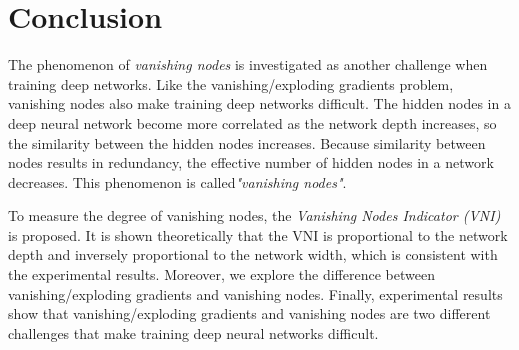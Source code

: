 \chapter{Conclusion} \label{conclusion}

The phenomenon of \textit{vanishing nodes}  is investigated as another challenge  when training deep networks.
Like the vanishing/exploding gradients problem, vanishing nodes also make training deep networks difficult.
The hidden nodes in a deep neural network become more correlated as the network depth increases, so the similarity between the hidden nodes increases.
Because similarity between nodes results in redundancy, the effective number of hidden nodes in a network decreases.
This phenomenon is called\textit{"vanishing nodes"}.

To measure the degree of vanishing nodes, the \textit{Vanishing Nodes Indicator (VNI)} is proposed.
It is shown theoretically that the VNI is proportional to the network depth and inversely proportional to the network width, which is consistent with the experimental results.
Moreover, we explore the difference between vanishing/exploding gradients and vanishing nodes.
Finally, experimental results show that vanishing/exploding gradients and vanishing nodes are two different challenges that make training deep neural networks difficult. 
